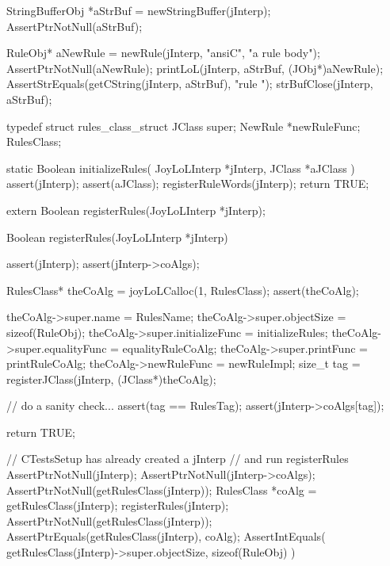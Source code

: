   StringBufferObj *aStrBuf = newStringBuffer(jInterp);
  AssertPtrNotNull(aStrBuf);
  
  RuleObj* aNewRule =
    newRule(jInterp, "ansiC", "a rule body");
  AssertPtrNotNull(aNewRule);
  printLoL(jInterp, aStrBuf, (JObj*)aNewRule);
  AssertStrEquals(getCString(jInterp, aStrBuf), "rule ");
  strBufClose(jInterp, aStrBuf);
\stopCTest
\stopTestCase
\stopTestSuite

\startTestSuite[registerRules]

\startCHeader
typedef struct rules_class_struct {
  JClass       super;
  NewRule      *newRuleFunc;
} RulesClass;

\stopCHeader

\startCCode
static Boolean initializeRules(
  JoyLoLInterp *jInterp,
  JClass   *aJClass
) {
  assert(jInterp);
  assert(aJClass);
  registerRuleWords(jInterp);
  return TRUE;
}
\stopCCode

\startCHeader
extern Boolean registerRules(JoyLoLInterp *jInterp);
\stopCHeader
{}

\startCCode
Boolean registerRules(JoyLoLInterp *jInterp) {
  assert(jInterp);
  assert(jInterp->coAlgs);
  
  RulesClass* theCoAlg
    = joyLoLCalloc(1, RulesClass);
  assert(theCoAlg);
  
  theCoAlg->super.name           = RulesName;
  theCoAlg->super.objectSize     = sizeof(RuleObj);
  theCoAlg->super.initializeFunc = initializeRules;
  theCoAlg->super.equalityFunc   = equalityRuleCoAlg;
  theCoAlg->super.printFunc      = printRuleCoAlg;
  theCoAlg->newRuleFunc = newRuleImpl;
  size_t tag =
    registerJClass(jInterp, (JClass*)theCoAlg);
  
  // do a sanity check...
  assert(tag == RulesTag);
  assert(jInterp->coAlgs[tag]);
   
  return TRUE;
}
\stopCCode


\startCTest
  // CTestsSetup has already created a jInterp
  // and run registerRules
  AssertPtrNotNull(jInterp);
  AssertPtrNotNull(jInterp->coAlgs);
  AssertPtrNotNull(getRulesClass(jInterp));
  RulesClass *coAlg = getRulesClass(jInterp);
  registerRules(jInterp);
  AssertPtrNotNull(getRulesClass(jInterp));
  AssertPtrEquals(getRulesClass(jInterp), coAlg);
  AssertIntEquals(
    getRulesClass(jInterp)->super.objectSize,
    sizeof(RuleObj)
  )
\stopCTest
\stopTestCase
\stopTestSuite
